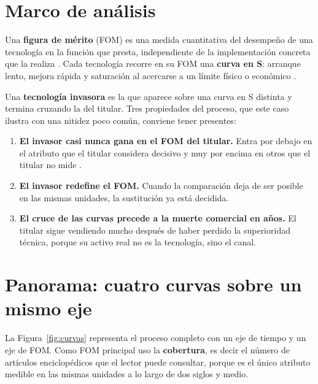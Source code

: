 \documentclass[11pt,letterpaper]{article}
\begin{document}
\section{Marco de análisis}

Una \textbf{figura de mérito} (FOM) es una medida cuantitativa del desempeño de
una tecnología en la función que presta, independiente de la implementación
concreta que la realiza \parencite{deweck2022}. Cada tecnología recorre en su
FOM una \textbf{curva en S}: arranque lento, mejora rápida y saturación al
acercarse a un límite físico o económico \parencite{foster1986,utterback1994}.

Una \textbf{tecnología invasora} es la que aparece sobre una curva en S distinta
y termina cruzando la del titular. Tres propiedades del proceso, que este caso
ilustra con una nitidez poco común, conviene tener presentes:

\begin{enumerate}
  \item \textbf{El invasor casi nunca gana en el FOM del titular.} Entra por
    debajo en el atributo que el titular considera decisivo y muy por encima en
    otros que el titular no mide \parencite{christensen1997}.
  \item \textbf{El invasor redefine el FOM.} Cuando la comparación deja de ser
    posible en las mismas unidades, la sustitución ya está decidida.
  \item \textbf{El cruce de las curvas precede a la muerte comercial en años.}
    El titular sigue vendiendo mucho después de haber perdido la superioridad
    técnica, porque su activo real no es la tecnología, sino el canal.
\end{enumerate}

\section{Panorama: cuatro curvas sobre un mismo eje}

La Figura~\ref{fig:curvas} representa el proceso completo con un eje de tiempo y
un eje de FOM. Como FOM principal uso la \textbf{cobertura}, es decir el número
de artículos enciclopédicos que el lector puede consultar, porque es el único
atributo medible en las mismas unidades a lo largo de dos siglos y medio.
\end{document}
